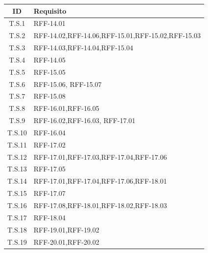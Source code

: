\begin{tabularx}{\textwidth}{|c|X|}
    \hline
    \textbf{ID} & \textbf{Requisito}\\
    \hline
    \label{ts:ts1} T.S.1 & RFF-14.01\\
    \hline
    \label{ts:ts2} T.S.2 & RFF-14.02,RFF-14.06,RFF-15.01,RFF-15.02,RFF-15.03\\
    \hline
    \label{ts:ts3} T.S.3 & RFF-14.03,RFF-14.04,RFF-15.04\\
    \hline
    \label{ts:ts4} T.S.4 & RFF-14.05\\
    \hline
    \label{ts:ts5} T.S.5 & RFF-15.05\\
    \hline
    \label{ts:ts6} T.S.6 & RFF-15.06, RFF-15.07\\
    \hline
    \label{ts:ts7} T.S.7 & RFF-15.08\\
    \hline
    \label{ts:ts8} T.S.8 & RFF-16.01,RFF-16.05\\
    \hline
    \label{ts:ts9} T.S.9 & RFF-16.02,RFF-16.03, RFF-17.01\\
    \hline
    \label{ts:ts10} T.S.10 & RFF-16.04\\
    \hline
    \label{ts:ts11} T.S.11 & RFF-17.02\\
    \hline
    \label{ts:ts12} T.S.12 & RFF-17.01,RFF-17.03,RFF-17.04,RFF-17.06\\
    \hline
    \label{ts:ts13} T.S.13 & RFF-17.05\\
    \hline
    \label{ts:ts14} T.S.14 & RFF-17.01,RFF-17.04,RFF-17.06,RFF-18.01\\
    \hline
    \label{ts:ts15} T.S.15 & RFF-17.07\\
    \hline
    \label{ts:ts16} T.S.16 & RFF-17.08,RFF-18.01,RFF-18.02,RFF-18.03\\
    \hline
    \label{ts:ts17} T.S.17 & RFF-18.04\\
    \hline
    \label{ts:ts18} T.S.18 & RFF-19.01,RFF-19.02\\
    \hline
    \label{ts:ts19} T.S.19 & RFF-20.01,RFF-20.02\\
    \hline
\end{tabularx}



